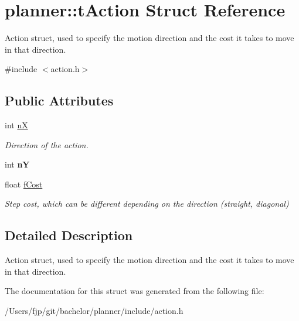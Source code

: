 \hypertarget{structplanner_1_1t_action}{}\section{planner\+:\+:t\+Action Struct Reference}
\label{structplanner_1_1t_action}


Action struct, used to specify the motion direction and the cost it takes to move in that direction.  




{\ttfamily \#include $<$action.\+h$>$}

\subsection*{Public Attributes}
\begin{DoxyCompactItemize}
\item 
\mbox{\label{structplanner_1_1t_action_a6cf36892b4601d7d267d1a9d2e9d6595}} 
int \mbox{\hyperlink{structplanner_1_1t_action_a6cf36892b4601d7d267d1a9d2e9d6595}{nX}}
\begin{DoxyCompactList}\small\item\em Direction of the action. \end{DoxyCompactList}\item 
\mbox{\label{structplanner_1_1t_action_a382637fed2bbf09a18d5f42201704314}} 
int {\bfseries nY}
\item 
\mbox{\label{structplanner_1_1t_action_ad90ddd244d8eb12cb6460797755e8b07}} 
float \mbox{\hyperlink{structplanner_1_1t_action_ad90ddd244d8eb12cb6460797755e8b07}{f\+Cost}}
\begin{DoxyCompactList}\small\item\em Step cost, which can be different depending on the direction (straight, diagonal) \end{DoxyCompactList}\end{DoxyCompactItemize}


\subsection{Detailed Description}
Action struct, used to specify the motion direction and the cost it takes to move in that direction. 

The documentation for this struct was generated from the following file\+:\begin{DoxyCompactItemize}
\item 
/\+Users/fjp/git/bachelor/planner/include/action.\+h\end{DoxyCompactItemize}
